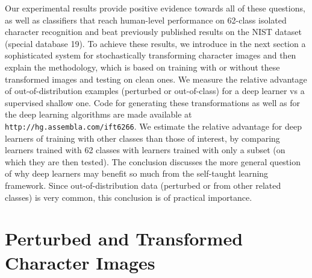 \documentclass{article} %
\begin{document}
Our experimental results provide positive evidence towards all of these questions,
as well as classifiers that reach human-level performance on 62-class isolated character
recognition and beat previously published results on the NIST dataset (special database 19).
To achieve these results, we introduce in the next section a sophisticated system
for stochastically transforming character images and then explain the methodology,
which is based on training with or without these transformed images and testing on 
clean ones. We measure the relative advantage of out-of-distribution examples
(perturbed or out-of-class)
for a deep learner vs a supervised shallow one.
Code for generating these transformations as well as for the deep learning 
algorithms are made available at {\tt http://hg.assembla.com/ift6266}.
We estimate the relative advantage for deep learners of training with
other classes than those of interest, by comparing learners trained with
62 classes with learners trained with only a subset (on which they
are then tested).
The conclusion discusses
the more general question of why deep learners may benefit so much from 
the self-taught learning framework. Since out-of-distribution data
(perturbed or from other related classes) is very common, this conclusion
is of practical importance.

\section{Perturbed and Transformed Character Images}
\label{s:perturbations}
\end{document}

